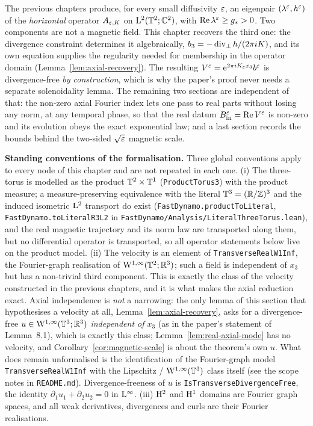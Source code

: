 The previous chapters produce, for every small diffusivity $\varepsilon$, an eigenpair
$(\lambda^\varepsilon,h^\varepsilon)$ of the \emph{horizontal} operator $A_{\varepsilon,K}$ on
$\mathrm{L}^2(\mathbb{T}^2;\mathbb{C}^2)$, with $\operatorname{Re}\lambda^\varepsilon\geq g_*>0$.  Two components are not a magnetic
field.  This chapter recovers the third one: the divergence constraint determines it
algebraically, $b_3=-\operatorname{div}_\perp h/(2\pi iK)$, and its own equation supplies the regularity
needed for membership in the operator domain (Lemma~\ref{lem:axial-recovery}).  The
resulting $V^\varepsilon=\mathrm{e}^{2\pi iK_\varepsilon x_3}b^\varepsilon$ is divergence-free \emph{by construction},
which is why the paper's proof never needs a separate solenoidality lemma.  The remaining
two sections are independent of that: the non-zero axial Fourier index lets one
pass to real parts without losing any norm, at any temporal phase, so that the real datum
$B_{\rm in}^\varepsilon=\operatorname{Re} V^\varepsilon$ is non-zero and its evolution obeys the exact exponential law;
and a last section records the bounds behind the two-sided $\sqrt{\varepsilon}$ magnetic scale.

\textbf{Standing conventions of the formalisation.}  Three global conventions apply to every node
of this chapter and are not repeated in each one.  (i) The three-torus is modelled as the product
$\mathbb{T}^2\times\mathbb{T}^1$ (\texttt{ProductTorus3}) with the product measure; a measure-preserving
equivalence with the literal $\mathbb{T}^3=(\mathbb{R}/\mathbb{Z})^3$ and the induced isometric $\mathrm{L}^2$ transport do exist
(\texttt{FastDynamo.productToLiteral}, \texttt{FastDynamo.toLiteralR3L2} in
\texttt{FastDynamo/Analysis/LiteralThreeTorus.lean}), and the real magnetic trajectory and its norm
law are transported along them, but no differential operator is transported, so all operator
statements below live on the product model.  (ii) The velocity is an element of
\texttt{TransverseRealW1Inf}, the Fourier-graph realisation of $\mathrm{W}^{1,\infty}(\mathbb{T}^2;\mathbb{R}^3)$; such a
field is independent of $x_3$ but has a non-trivial third component.  This is exactly the class of
the velocity constructed in the previous chapters, and it is what makes the axial reduction exact.
Axial independence is \emph{not} a narrowing: the only lemma of this section that hypothesises a
velocity at all, Lemma~\ref{lem:axial-recovery}, asks for a divergence-free
$u\in\mathrm{W}^{1,\infty}(\mathbb{T}^3;\mathbb{R}^3)$ \emph{independent of $x_3$} (as in the paper's statement of
Lemma~8.1), which is exactly this class; Lemma~\ref{lem:real-axial-mode} has no velocity, and
Corollary~\ref{cor:magnetic-scale} is about the theorem's own $u$.  What does remain
unformalised is the identification of the Fourier-graph model \texttt{TransverseRealW1Inf} with
the Lipschitz / $\mathrm{W}^{1,\infty}(\mathbb{T}^3)$ class itself (see the scope notes in
\texttt{README.md}).  Divergence-freeness of $u$
is \texttt{IsTransverseDivergenceFree}, the identity $\partial_1u_1+\partial_2u_2=0$ in
$\mathrm{L}^\infty$.  (iii) $\mathrm{H}^2$ and $\mathrm{H}^1$ domains are Fourier graph spaces, and all weak
derivatives, divergences and curls are their Fourier realisations.

